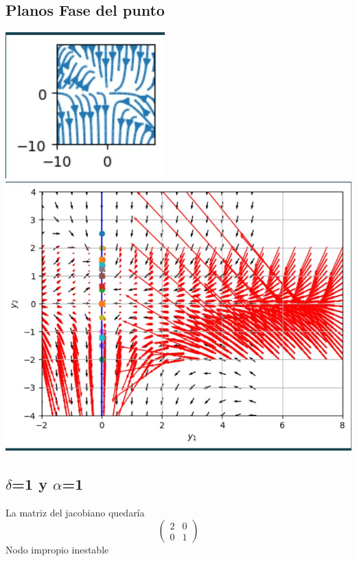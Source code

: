 \documentclass{article}
\begin{document}
         \subsection*{Planos Fase del punto }
         \noindent
         \includegraphics{punto silla inestable isoclinas.jpg}
          \includegraphics{punto silla inestable.jpg}
           
   \subsection*{$\delta$=1 y $\alpha$=1}
       
        La matriz del jacobiano quedaría
        \[
         \left(
         \begin{array}{lc}
           2 & 0\\
           0 & 1
         \end{array}
         \right)
         \]         
         Nodo impropio inestable
\end{document}
